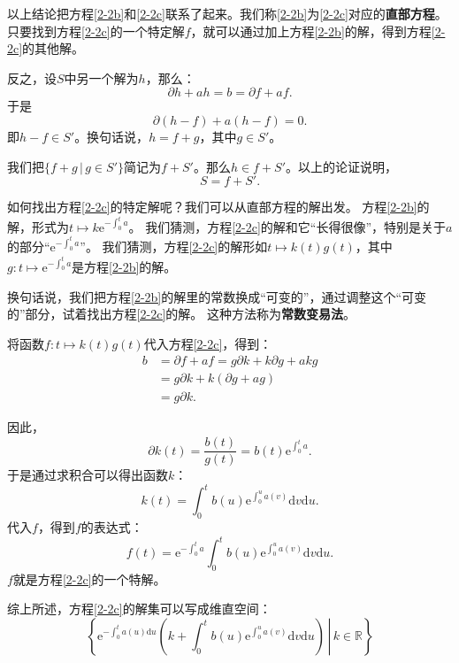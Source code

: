 \documentclass[12pt,UTF8]{ctexbook}
\newcommand{\e}{\mathrm{e}}
\theoremstyle{definition}
\theoremstyle{plain}
\begin{document}
以上结论把方程\eqref{2-2b}和\eqref{2-2c}联系了起来。我们称\eqref{2-2b}为\eqref{2-2c}对应的\textbf{直部方程}。
只要找到方程\eqref{2-2c}的一个特定解$f$，就可以通过加上方程\eqref{2-2b}的解，得到方程\eqref{2-2c}的其他解。

反之，设$S$中另一个解为$h$，那么：
$$ \partial h + a h = b = \partial f + a f. $$
于是
$$ \partial (h - f) + a (h - f) = 0. $$
即$h - f \in S'$。换句话说，$h = f + g$，其中$g\in S'$。

我们把$\{f + g \, | \, g\in S'\}$简记为$f + S'$。那么$h\in f + S'$。以上的论证说明，
$$S = f + S'. $$

如何找出方程\eqref{2-2c}的特定解呢？我们可以从直部方程的解出发。
方程\eqref{2-2b}的解，形式为$t\mapsto k\e^{-\int_0^t a}$。
我们猜测，方程\eqref{2-2c}的解和它“长得很像”，特别是关于$a$的部分“$\e^{-\int_0^t a}$”。
我们猜测，方程\eqref{2-2c}的解形如$t\mapsto k(t) g(t)$，其中$g: t\mapsto \e^{-\int_0^t a}$是方程\eqref{2-2b}的解。

换句话说，我们把方程\eqref{2-2b}的解里的常数换成“可变的”，通过调整这个“可变的”部分，试着找出方程\eqref{2-2c}的解。
这种方法称为\textbf{常数变易法}。

将函数$f: t\mapsto k(t) g(t)$代入方程\eqref{2-2c}，得到：
\begin{align*}
    b &= \partial f + a f = g \partial k + k \partial g + a k g \\
    &= g\partial k + k (\partial g + a g) \\
    &= g\partial k.
\end{align*}

因此，
$$ \partial k(t) = \frac{b(t)}{g(t)} = b(t) \e^{\int_0^t a}. $$
于是通过求积合可以得出函数$k$：
$$ k(t) = \int_0^t b(u) \e^{\int_0^u a(v)}\mathrm{d}v \mathrm{d}u. $$
代入$f$，得到$f$的表达式：
$$ f(t) = \e^{-\int_0^t a} \int_0^t b(u) \e^{\int_0^u a(v)}\mathrm{d}v \mathrm{d}u. $$
$f$就是方程\eqref{2-2c}的一个特解。

综上所述，方程\eqref{2-2c}的解集可以写成维直空间：
$$\left\{\left.\e^{-\int_0^t a(u)\mathrm{d}u} \left(k + \int_0^t b(u) \e^{\int_0^u a(v)}\mathrm{d}v \mathrm{d}u\right) \, \right| \, k\in \mathbb{R}\right\}$$
\end{document}
